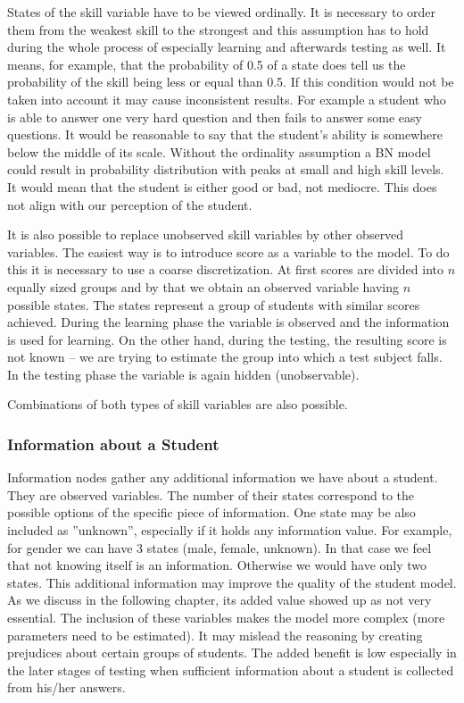 States of the skill variable have to be viewed ordinally. It is necessary to order them from the weakest skill to the strongest and this assumption has to hold during the whole process of especially learning and afterwards testing as well. It means, for example, that the probability of 0.5 of a state does tell us the probability of the skill being less or equal than 0.5. If this condition would not be taken into account it may cause inconsistent results. For example a student who is able to answer one very hard question and then fails to answer some easy questions. It would be reasonable to say that the student's ability is somewhere below the middle of its scale. Without the ordinality assumption a BN model could result in probability distribution with peaks at small and high skill levels. It would mean that the student is either good or bad, not mediocre. This does not align with our perception of the student.

\label{observed_score}
It is also possible to replace unobserved skill variables by other observed variables. The easiest way is to introduce score as a variable to the model. To do this it is necessary to use a coarse discretization. At first scores are divided into $n$ equally sized groups and by that we obtain an observed variable having $n$ possible states. The states represent a group of students with similar scores achieved. During the learning phase the variable is observed and the information is used for learning. On the other hand, during the testing, the resulting score is not known -- we are trying to estimate the group into which a test subject falls. In the testing phase the variable is again hidden (unobservable).

Combinations of both types of skill variables are also possible.

\subsubsection{Information about a Student}
Information nodes gather any additional information we have about a student. They are observed variables. The number of their states correspond to the possible options of the specific piece of information. One state may be also included as ''unknown'', especially if it holds any information value. For example, for gender we can have 3 states (male, female, unknown). In that case we feel that not knowing itself is an information. Otherwise we would have only two states.
This additional information may improve the quality of the student model. As we discuss in the following chapter, its added value showed up as not very essential. The inclusion of these variables makes the model more complex (more parameters need to be estimated). It may mislead the reasoning by creating prejudices about certain groups of students. The added benefit is low especially in the later stages of testing when sufficient information about a student is collected from his/her answers. 


